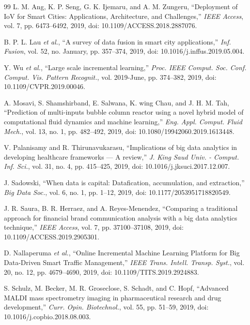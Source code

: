 \documentclass[10pt,a4paper]{article}
\begin{document}
\begin{thebibliography}{99}
L. M. Ang, K. P. Seng, G. K. Ijemaru, and A. M. Zungeru, ``Deployment of IoV for Smart Cities: Applications, Architecture, and Challenges,'' \textit{IEEE Access}, vol. 7, pp. 6473--6492, 2019, doi: 10.1109/ACCESS.2018.2887076.

B. P. L. Lau \textit{et al.}, ``A survey of data fusion in smart city applications,'' \textit{Inf. Fusion}, vol. 52, no. January, pp. 357--374, 2019, doi: 10.1016/j.inffus.2019.05.004.

Y. Wu \textit{et al.}, ``Large scale incremental learning,'' \textit{Proc. IEEE Comput. Soc. Conf. Comput. Vis. Pattern Recognit.}, vol. 2019-June, pp. 374--382, 2019, doi: 10.1109/CVPR.2019.00046.

A. Mosavi, S. Shamshirband, E. Salwana, K. wing Chau, and J. H. M. Tah, ``Prediction of multi-inputs bubble column reactor using a novel hybrid model of computational fluid dynamics and machine learning,'' \textit{Eng. Appl. Comput. Fluid Mech.}, vol. 13, no. 1, pp. 482--492, 2019, doi: 10.1080/19942060.2019.1613448.

V. Palanisamy and R. Thirunavukarasu, ``Implications of big data analytics in developing healthcare frameworks --- A review,'' \textit{J. King Saud Univ. - Comput. Inf. Sci.}, vol. 31, no. 4, pp. 415--425, 2019, doi: 10.1016/j.jksuci.2017.12.007.

J. Sadowski, ``When data is capital: Datafication, accumulation, and extraction,'' \textit{Big Data Soc.}, vol. 6, no. 1, pp. 1--12, 2019, doi: 10.1177/2053951718820549.

J. R. Saura, B. R. Herraez, and A. Reyes-Menendez, ``Comparing a traditional approach for financial brand communication analysis with a big data analytics technique,'' \textit{IEEE Access}, vol. 7, pp. 37100--37108, 2019, doi: 10.1109/ACCESS.2019.2905301.

D. Nallaperuma \textit{et al.}, ``Online Incremental Machine Learning Platform for Big Data-Driven Smart Traffic Management,'' \textit{IEEE Trans. Intell. Transp. Syst.}, vol. 20, no. 12, pp. 4679--4690, 2019, doi: 10.1109/TITS.2019.2924883.

S. Schulz, M. Becker, M. R. Groseclose, S. Schadt, and C. Hopf, ``Advanced MALDI mass spectrometry imaging in pharmaceutical research and drug development,'' \textit{Curr. Opin. Biotechnol.}, vol. 55, pp. 51--59, 2019, doi: 10.1016/j.copbio.2018.08.003.


\end{thebibliography}
\end{document}
